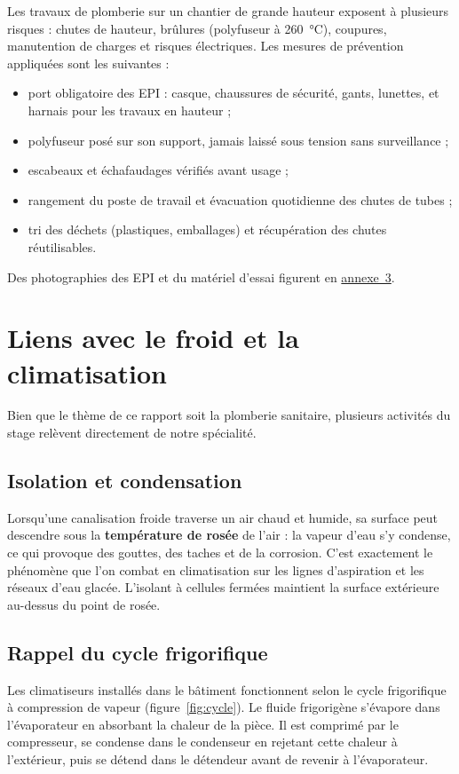 Les travaux de plomberie sur un chantier de grande hauteur exposent à plusieurs risques :
chutes de hauteur, brûlures (polyfuseur à \SI{260}{\celsius}), coupures, manutention de charges
et risques électriques. Les mesures de prévention appliquées sont les suivantes :
\begin{itemize}
  \item port obligatoire des EPI : casque, chaussures de sécurité, gants, lunettes, et
        harnais pour les travaux en hauteur ;
  \item polyfuseur posé sur son support, jamais laissé sous tension sans surveillance ;
  \item escabeaux et échafaudages vérifiés avant usage ;
  \item rangement du poste de travail et évacuation quotidienne des chutes de tubes ;
  \item tri des déchets (plastiques, emballages) et récupération des chutes réutilisables.
\end{itemize}
Des photographies des EPI et du matériel d'essai figurent en \hyperref[ann:photos]{annexe~3}.

\section{Liens avec le froid et la climatisation}

Bien que le thème de ce rapport soit la plomberie sanitaire, plusieurs activités du stage
relèvent directement de notre spécialité.

\subsection{Isolation et condensation}
Lorsqu'une canalisation froide traverse un air chaud et humide, sa surface peut descendre
sous la \textbf{température de rosée} de l'air : la vapeur d'eau s'y condense, ce qui provoque
des gouttes, des taches et de la corrosion. C'est exactement le phénomène que l'on combat en
climatisation sur les lignes d'aspiration et les réseaux d'eau glacée. L'isolant à cellules
fermées maintient la surface extérieure au-dessus du point de rosée.

\subsection{Rappel du cycle frigorifique}
Les climatiseurs installés dans le bâtiment fonctionnent selon le cycle frigorifique à
compression de vapeur (figure~\ref{fig:cycle}). Le fluide frigorigène s'évapore dans
l'évaporateur en absorbant la chaleur de la pièce. Il est comprimé par le compresseur, se
condense dans le condenseur en rejetant cette chaleur à l'extérieur, puis se détend dans le
détendeur avant de revenir à l'évaporateur.

